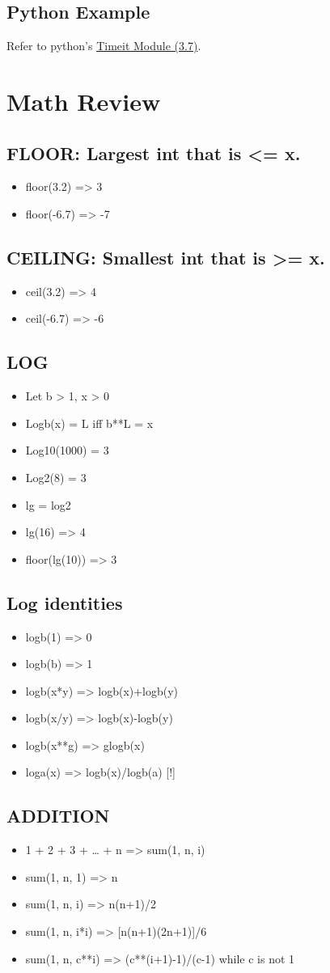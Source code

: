\documentclass[11pt]{article}
\begin{document}
\subsection{Python Example}
\label{sec:org016d120}
Refer to python's \href{https://docs.python.org/3.7/library/timeit.html}{Timeit Module (3.7)}.

\section{Math Review}
\label{sec:org8cbfba2}
\subsection{FLOOR: Largest int that is <= x.}
\label{sec:org2622206}
\begin{itemize}
\item floor(3.2) => 3
\item floor(-6.7) => -7
\end{itemize}
\subsection{CEILING: Smallest int that is >= x.}
\label{sec:org5e48513}
\begin{itemize}
\item ceil(3.2) => 4
\item ceil(-6.7) => -6
\end{itemize}
\subsection{LOG}
\label{sec:org760d679}
\begin{itemize}
\item Let b > 1, x > 0
\item Logb(x) = L iff b**L = x
\item Log10(1000) = 3
\item Log2(8) = 3
\item lg = log2
\item lg(16) => 4
\item floor(lg(10)) => 3
\end{itemize}
\subsection{Log identities}
\label{sec:org97aaeb5}
\begin{itemize}
\item logb(1) => 0
\item logb(b) => 1
\item logb(x*y) => logb(x)+logb(y)
\item logb(x/y) => logb(x)-logb(y)
\item logb(x**g) => glogb(x)
\item loga(x) => logb(x)/logb(a) [!]
\end{itemize}
\subsection{ADDITION}
\label{sec:org7b0e463}
\begin{itemize}
\item 1 + 2 + 3 + \ldots{} + n => sum(1, n, i)
\item sum(1, n, 1) => n
\item sum(1, n, i) => n(n+1)/2
\item sum(1, n, i*i) => [n(n+1)(2n+1)]/6
\item sum(1, n, c**i) => (c**(i+1)-1)/(c-1) while c is not 1
\end{itemize}
\end{document}
